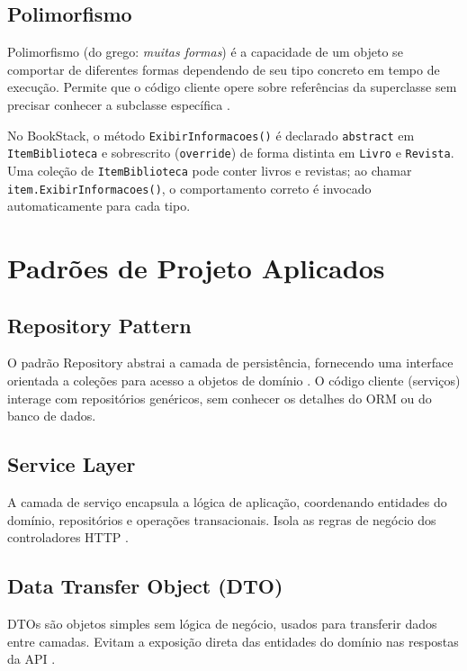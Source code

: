 \documentclass[
  12pt,
  a4paper,
  oneside,
  brazil
]{abntex2}
\begin{document}
\subsection{Polimorfismo}

Polimorfismo (do grego: \textit{muitas formas}) é a capacidade de um objeto se comportar de diferentes formas dependendo de seu tipo concreto em tempo de execução. Permite que o código cliente opere sobre referências da superclasse sem precisar conhecer a subclasse específica \cite{pressman2016}.

No BookStack, o método \texttt{ExibirInformacoes()} é declarado \texttt{abstract} em \texttt{ItemBiblioteca} e sobrescrito (\texttt{override}) de forma distinta em \texttt{Livro} e \texttt{Revista}. Uma coleção de \texttt{ItemBiblioteca} pode conter livros e revistas; ao chamar \texttt{item.ExibirInformacoes()}, o comportamento correto é invocado automaticamente para cada tipo.

\section{Padrões de Projeto Aplicados}

\subsection{Repository Pattern}

O padrão Repository abstrai a camada de persistência, fornecendo uma interface orientada a coleções para acesso a objetos de domínio \cite{fowler2002}. O código cliente (serviços) interage com repositórios genéricos, sem conhecer os detalhes do ORM ou do banco de dados.

\subsection{Service Layer}

A camada de serviço encapsula a lógica de aplicação, coordenando entidades do domínio, repositórios e operações transacionais. Isola as regras de negócio dos controladores HTTP \cite{fowler2002}.

\subsection{Data Transfer Object (DTO)}

DTOs são objetos simples sem lógica de negócio, usados para transferir dados entre camadas. Evitam a exposição direta das entidades do domínio nas respostas da API \cite{gamma1995}.
\end{document}
